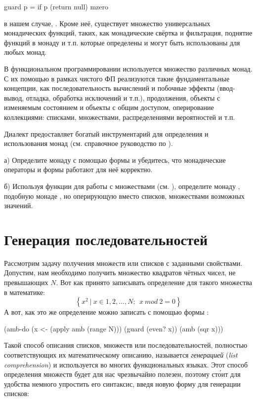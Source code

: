 \begin{SchemeCode}
  guard p = if p (return null) mzero
\end{SchemeCode}
в нашем случае, .
Кроме неё, существует множество универсальных монадических функций, таких, как монадические свёртка и фильтрация, поднятие функций в монаду и т.п. которые определены и могут быть использованы для любых монад.

В функциональном программировании используется множество различных монад. С их помощью в рамках чистого ФП реализуются такие фундаментальные концепции, как последовательность вычислений и побочные эффекты (ввод-вывод, отладка, обработка исключений и т.п.), продолжения, объекты с изменяемым состоянием и объекты с общим доступом, оперирование коллекциями: списками, множествами, распределениями вероятностей и т.п.

\begin{Assignment}
Диалект \FLP предоставляет богатый инструментарий для определения и использования монад (см. справочное руководство по \FLP).

а) Определите монаду  с помощью формы  и убедитесь, что монадические операторы и формы работают для неё корректно.

б) Используя функции для работы с множествами (см. ), определите монаду , подобную монаде , но оперирующую вместо списков, множествами возможных значений. 

\end{Assignment}

\section{Генерация последовательностей}%
Рассмотрим задачу получения множеств или списков с заданными свойствами. Допустим, нам необходимо получить множество квадратов чётных чисел, не превышающих $N$.  Вот как принято записывать определение для такого множества в математике:  $$\left\{ x^2~|~x \in {1, 2, ..., N};~~ x~mod~2 = 0 \right\}$$
А вот, как это же определение можно записать с помощью формы :
\begin{SchemeCode}[emph={x,N}]
  (amb-do
    (x <- (apply amb (range N)))
    (guard (even? x))
    (amb (sqr x)))
\end{SchemeCode}

Такой способ описания списков, множеств или последовательностей, полностью соответствующих их математическому описанию, называется \emph{генерацией} (\emph{list comprehension}) и используется во многих функциональных языках. Этот способ определения множеств будет для нас чрезвычайно полезен, поэтому ст\'{о}ит для удобства немного упростить его синтаксис, введя новую форму  для генерации списков:

